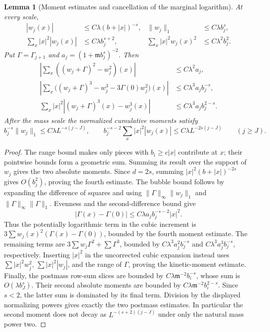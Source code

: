 \documentclass[11pt]{article}
\newtheorem{lemma}[proposition]{Lemma}
\begin{document}
\begin{lemma}[Moment estimates and cancellation of the marginal logarithm]
\label{completion:moments}
At every scale,
\begin{align*}
 |w_j(x)|&\le C\lambda(b+|x|)^{-s},&
 \|w_j\|_1&\le C\lambda b_j^s,\\
 \sum_x|x|^2|w_j(x)|&\le C\lambda b_j^{s+2},&
 \sum_x|x|^2w_j(x)^2&\le C\lambda^2b_j^2.
\end{align*}
Put \(\Gamma=\Gamma_{j+1}\) and
\(a_j=(1+\mathfrak m b_j^s)^{-2}\). Then
\begin{align*}
 \left|\sum_x((w_j+\Gamma)^2-w_j^2)(x)\right|
    &\le C\lambda^2a_j,\\
 \left|\sum_x\big((w_j+\Gamma)^3-w_j^3
                   -3\Gamma(0)w_j^2\big)(x)\right|
    &\le C\lambda^3a_j b_j^{-s},\\
 \sum_x|x|^2\left|(w_j+\Gamma)^3(x)-w_j^3(x)\right|
    &\le C\lambda^3a_j b_j^{2-s}.
\end{align*}
After the mass scale the normalized cumulative moments satisfy
\[
 b_j^{-s}\|w_j\|_1\le C\lambda L^{-s(j-J)},\qquad
 b_j^{-s-2}\sum_x|x|^2|w_j(x)|
       \le C\lambda L^{-2s(j-J)}\qquad(j\ge J).
\]
\end{lemma}
\begin{proof}
The range bound makes only pieces with \(b_i\ge c|x|\) contribute
at \(x\); their pointwise bounds form a geometric sum. Summing its
result over the support of \(w_j\) gives the two absolute moments.
Since \(d=2s\), summing \(|x|^2(b+|x|)^{-2s}\) gives
\(O(b_j^2)\), proving the fourth estimate.
The bubble bound follows by expanding the difference of squares and
using \(\|\Gamma\|_\infty\|w_j\|_1\) and
\(\|\Gamma\|_\infty\|\Gamma\|_1\).
Evenness and the second-difference bound give
\[
 |\Gamma(x)-\Gamma(0)|
       \le C\lambda a_j b_j^{-s-2}|x|^2.
\]
Thus the potentially logarithmic term in the cubic increment is
\(3\sum w_j(x)^2(\Gamma(x)-\Gamma(0))\), bounded by the fourth
moment estimate. The remaining terms are
\(3\sum w_j\Gamma^2+\sum\Gamma^3\), bounded by
\(C\lambda^3a_j^2b_j^{-s}\) and
\(C\lambda^3a_j^3b_j^{-s}\), respectively.
Inserting \(|x|^2\) in the uncorrected cubic expansion instead
uses \(\sum|x|^2w_j^2\), \(\sum|x|^2|w_j|\), and the
range of \(\Gamma\), proving the kinetic-moment estimate.
Finally, the postmass row-sum slices are bounded by
\(C\lambda\mathfrak m^{-2}b_i^{-s}\), whose sum is
\(O(\lambda b_J^s)\). Their second absolute moments are bounded by
\(C\lambda\mathfrak m^{-2}b_i^{2-s}\). Since \(s<2\), the latter sum
is dominated by its final term. Division by the displayed normalizing
powers gives exactly the two postmass estimates. In particular the
second moment does not decay as \(L^{-(s+2)(j-J)}\) under only the
natural mass power two.
\end{proof}
\end{document}
